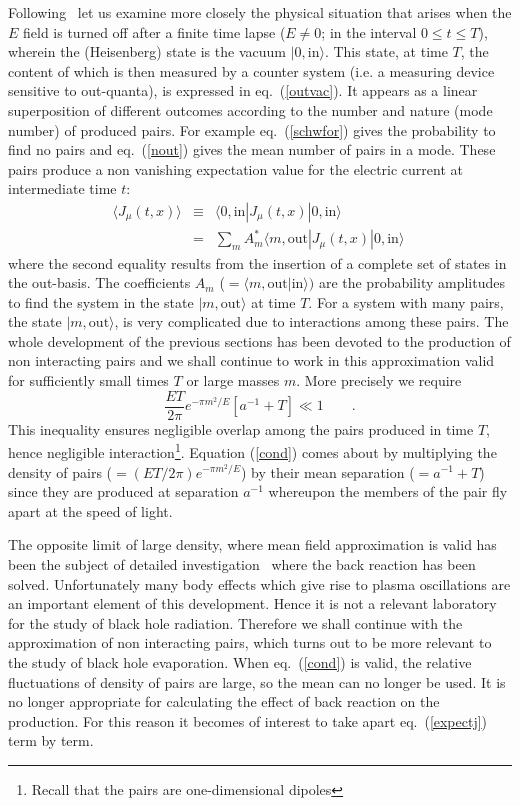 \documentclass[12pt,oneside]{report}
\def\ket#1{|#1\rangle}
\def\elematrice#1#2#3{\langle #1|#2|#3 \rangle}
\begin{document}
 
Following~\cite{BMPPS} let 
us examine more closely the physical situation that arises 
when the $E$ field is  turned off after
a finite time lapse ($E\neq 0$; in the interval $0\leq t \leq T$), wherein
the (Heisenberg)
state is the vacuum $|0,\mbox{in}\rangle$. This state, at time $T$, the content of
which is then
 measured by a counter system (i.e. a measuring device sensitive to
out-quanta), is
expressed in eq.~(\ref{outvac}). It appears as a linear superposition of
 different
outcomes according
 to the number and nature (mode number) of produced pairs.
For example eq.~(\ref{schwfor}) gives the 
probability to find no pairs and eq.~(\ref{nout}) gives the mean number of pairs in
a mode. These pairs produce a non vanishing expectation value for the
electric current at intermediate time $t$:
\begin{eqnarray}
\langle J_{\mu}(t,x) \rangle &\equiv&\elematrice{0,\mbox{in}}
{J_{\mu}(t,x)}{0,\mbox{in}}\nonumber \\
&=&\sum_{m}A_{m}^{*}\elematrice{m,\mbox{out}}{J_{\mu}(t,x)}
{0,\mbox{in}}\
\label{expectj}
\end{eqnarray}
where the second equality results from 
the insertion of  a complete set of states in the out-basis. The coefficients
$A_{m}$ ($=\langle m ,\mbox{out}|\mbox{in}\rangle)$ 
are the probability amplitudes to find the system in the state
$\ket{m,\mbox{out}}$ at time
$T$. For a system with many pairs, the state $\ket{m,\mbox{out}}$, is very
complicated due to
interactions among these pairs. The whole development of the previous
sections has been
devoted to the production of non interacting pairs and we shall continue to
work in this
approximation valid for sufficiently small times $T$ or large masses $m$.
More precisely we require 
\begin{equation}
\frac {ET}{2\pi}e^{-\pi m^2/E}[a^{-1}+T]\ll1\qquad .\label{cond}
\end {equation}
This inequality ensures negligible overlap among the pairs produced in time
$T$, hence
negligible interaction\footnote {Recall that the pairs are one-dimensional
dipoles}.
Equation (\ref{cond}) comes about by multiplying the density of pairs
($=(ET/2\pi)e^{-\pi m^2/E}$) by their mean separation ($=a^{-1}+T$) since they are
produced at
separation $a^{-1}$ whereupon the members of the pair fly apart at the
speed of light.
\par The opposite limit of large density, where mean field approximation is
valid has been the
subject of detailed investigation~\cite{CoMo}
 where the back reaction has been solved.
Unfortunately
many body effects which give rise to plasma oscillations are an important
element of this
development. Hence it is not a relevant laboratory for the study of black
hole radiation.
Therefore we shall continue with the approximation of 
non interacting pairs, which turns out to
be more 
relevant to the study of black hole evaporation.
When eq.~(\ref{cond}) is valid, the relative fluctuations
of density of pairs 
are large, so the mean can no longer be used. It
is no longer appropriate
for calculating the effect of back reaction on the production. 
For this reason
it becomes of interest to take apart eq.~(\ref{expectj}) term by term.
\end{document}
